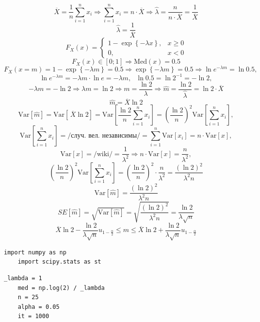 \documentclass[a4paper, 12pt]{article}
\begin{document}
    $$\overline{X}=\dfrac{1}{n}\sum\limits_{i=1}^{n}x_i\Rightarrow\sum\limits_{i=1}^{n}x_i=n\cdot\overline{X}\Rightarrow\hat{\lambda}=\dfrac{n}{n\cdot\overline{X}}=\dfrac{1}{\overline{X}}$$
    $$\hat{\lambda}=\dfrac{1}{\overline{X}}$$
    $$F_X(x)=\begin{cases}
        1-\exp{\left\{-\lambda x\right\}},& x\geq0\\
        0,& x<0
    \end{cases}$$
    $$F_X(x)\in\left[0;1\right]\Rightarrow\text{Med}\left(x\right)=0.5$$
    $$F_X(x=m)=1-\exp{\left\{-\lambda m\right\}}=0.5\Rightarrow\exp{\left\{-\lambda m\right\}}=0.5\Rightarrow\ln{e^{-\lambda m}}=\ln{0.5},$$
    $$\ln{e^{-\lambda m}}=-\lambda m\cdot\ln{e}=-\lambda m,\,\,\,\,\ln{0.5}=\ln{2^{-1}}=-\ln{2},$$
    $$-\lambda m=-\ln{2}\Rightarrow\lambda m=\ln{2}\Rightarrow m=\dfrac{\ln{2}}{\lambda}\Rightarrow\hat{m}=\dfrac{\ln{2}}{\hat{\lambda}}=\ln{2}\cdot\overline{X}$$
    $$\hat{m}=\overline{X}\ln{2}$$
    $$\text{Var}\left[\hat{m}\right]=\text{Var}\left[\,\overline{X}\ln{2}\right]=\text{Var}\left[\dfrac{\ln{2}}{n}\sum_{i=1}^{n}x_i\right]=\left(\dfrac{\ln{2}}{n}\right)^2\text{Var}\left[\sum_{i=1}^{n}x_i\right],$$
    $$\text{Var}\left[\sum_{i=1}^{n}x_i\right]=\text{/случ. вел. независимы/}=\sum_{i=1}^{n}\text{Var}\left[x_i\right]=n\cdot\text{Var}\left[x\right],$$
    $$\text{Var}\left[x\right]=\text{/wiki/}=\dfrac{1}{\lambda^2}\Rightarrow n\cdot\text{Var}\left[x\right]=\dfrac{n}{\lambda^2},$$
    $$\left(\dfrac{\ln{2}}{n}\right)^2\text{Var}\left[\sum_{i=1}^{n}x_i\right]=\left(\dfrac{\ln{2}}{n}\right)^2\cdot\dfrac{n}{\lambda^2}=\dfrac{\left(\ln{2}\right)^2}{\lambda^2 n}$$
    $$\text{Var}\left[\hat{m}\right]=\dfrac{\left(\ln{2}\right)^2}{\lambda^2 n}$$
    $$SE\left[\hat{m}\right]=\sqrt{\text{Var}\left[\hat{m}\right]}=\sqrt{\dfrac{\left(\ln{2}\right)^2}{\lambda^2 n}}=\dfrac{\ln{2}}{\lambda\sqrt{n}}$$
    $$\overline{X}\ln{2}-\dfrac{\ln{2}}{\lambda\sqrt{n}}u_{1-\frac{\alpha}{2}}\leq m\leq\overline{X}\ln{2}+\dfrac{\ln{2}}{\lambda\sqrt{n}}u_{1-\frac{\alpha}{2}}$$


    \begin{lstlisting}[label=imps2, caption={import}]
    import numpy as np
    import scipy.stats as st
    \end{lstlisting}


    \begin{lstlisting}[label=vars2, caption={pars}]
    _lambda = 1
    med = np.log(2) / _lambda
    n = 25
    alpha = 0.05
    it = 1000
    \end{lstlisting}
\end{document}
